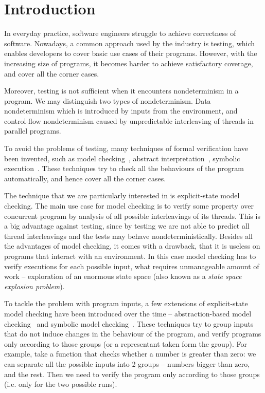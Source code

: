 \chapter{Introduction}\label{ch:Introduction}


\noindent

In everyday practice, software engineers struggle to achieve correctness of
software. Nowadays, a common approach used by the industry is testing, which
enables developers to cover basic use cases of their programs. However, with the
increasing size of programs, it becomes harder to achieve satisfactory
coverage, and cover all the corner cases.

Moreover, testing is not sufficient when it encounters nondeterminism in a
program. We may distinguish two types of nondeterminism. Data nondeterminism
which is introduced by inputs from the environment, and control-flow
nondeterminism caused by unpredictable interleaving of threads in parallel
programs.

To avoid the problems of testing, many techniques of formal verification have
been invented, such as model checking~\cite{Baier08}, abstract
interpretation~\cite{Cousot14}, symbolic execution~\cite{King76}. These
techniques try to check all the behaviours of the program automatically, and
hence cover all the corner cases.

The technique that we are particularly interested in is explicit-state model
checking. The main use case for model checking is to verify some
property over concurrent program by analysis of all possible
interleavings of its threads. This is a big advantage against testing, since
by testing we are not able to predict all thread interleavings and the tests may
behave nondeterministically. Besides all the advantages of model checking, it
comes with a drawback, that it is useless on programs that interact with an
environment. In this case model checking has to verify executions for each
possible input, what requires unmanageable amount of work -- exploration of an
enormous state space (also known as a \emph{state space explosion problem}).

To tackle the problem with program inputs, a few extensions of explicit-state
model checking have been introduced over the time -- abstraction-based model
checking~\cite{Clarke94} and symbolic model checking~\cite{Clarke96}. These
techniques try to group inputs that do not induce changes in the behaviour of the
program, and verify programs only according to those groups (or a representant
taken form the group). For example, take a function that checks whether a
number is greater than zero: we can separate all the possible inputs into 2
groups -- numbers bigger than zero, and the rest. Then we need to verify the
program only according to those groups (i.e. only for the two possible runs).

